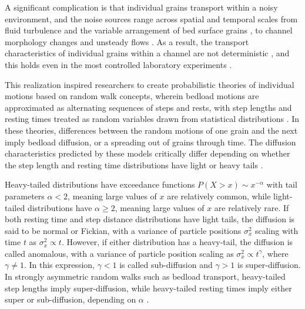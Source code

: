\documentclass[draft]{agujournal2018}
\begin{document}
A significant complication is that individual grains transport within a noisy environment, and the noise sources range across spatial and temporal scales from fluid turbulence \citep{Celik2014} and the variable arrangement of bed surface grains \citep{Gordon1972}, to channel morphology changes \citep{Hassan2017} and unsteady flows \citep{Phillips2013}.
As a result, the transport characteristics of individual grains within a channel are not deterministic \citep[e.g.][]{Einstein1937}, and this holds even in the most controlled laboratory experiments \citep[e.g.][]{Charru2004, Bohm2004, Fathel2015, Heyman2016}.

This realization inspired researchers to create probabilistic theories of individual motions based on random walk concepts, wherein bedload motions are approximated as alternating sequences of steps and rests, with step lengths and resting times treated as random variables drawn from statistical distributions \citep{Einstein1937, Yano1969, Nakagawa1976, Hassan1991, Bradley2012}.
In these theories, differences between the random motions of one grain and the next imply bedload diffusion, or a spreading out of grains through time.
The diffusion characteristics predicted by these models critically differ depending on whether the step length and resting time distributions have light or heavy tails \citep[e.g.][]{Bradley2017}.

Heavy-tailed distributions have exceedance functions $P(X>x) \sim x^{-\alpha}$ with tail parameters $\alpha < 2$, meaning large values of $x$ are relatively common, while light-tailed distributions have $\alpha \geq 2$, meaning large values of $x$ are relatively rare.
If both resting time and step distance distributions have light tails, the diffusion is said to be normal or Fickian, with a variance of particle positions $\sigma_x^2$
scaling with time $t$ as $\sigma_x^2 \propto t$.
However, if either distribution has a heavy-tail, the diffusion is called anomalous, with a variance of particle position scaling as $\sigma_x^2 \propto t^\gamma$, where $\gamma\neq 1$.
In this expression, $\gamma <1$ is called sub-diffusion and $\gamma > 1$ is super-diffusion.
In strongly asymmetric random walks such as bedload transport, heavy-tailed step lengths imply super-diffusion, while heavy-tailed resting times imply either super or sub-diffusion, depending on $\alpha$ \citep{Weeks1996, Weeks1998}.
\end{document}
